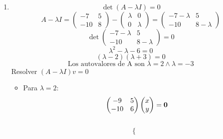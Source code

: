\documentclass[../practica.root.tex]{subfiles}
\begin{document}
\begin{enumerate}
\begin{enumerate*}
          \end{enumerate*}
          \begin{enumerate}
              \item \[ \det(A - \lambda I ) = 0 \]
                    \[ A - \lambda I = \begin{pmatrix}
                            -7  & 5 \\
                            -10 & 8
                        \end{pmatrix} - \begin{pmatrix}
                            \lambda & 0       \\
                            0       & \lambda
                        \end{pmatrix} = \begin{pmatrix}
                            -7 - \lambda & 5           \\
                            -10          & 8 - \lambda
                        \end{pmatrix} \]
                    \[ \det\begin{pmatrix}
                            -7 - \lambda & 5           \\
                            -10          & 8 - \lambda
                        \end{pmatrix} = 0 \]
                    \[ \lambda^2 - \lambda - 6 = 0 \]
                    \[ (\lambda - 2)(\lambda + 3) = 0 \]
                    \[ \boxed{\text{Los autovalores de A son } \lambda = 2 \land \lambda = -3} \]
                    Resolver $ ( A - \lambda I )v = 0 $
                    \begin{itemize}
                        \item Para $ \lambda = 2 $:
                              \[
                                  \begin{pmatrix}
                                      -9  & 5 \\
                                      -10 & 6
                                  \end{pmatrix}
                                  \begin{pmatrix}
                                      x \\ y
                                  \end{pmatrix}
                                  =
                                  \mathbf{0}
                              \] \[
                                  \begin{cases}

\end{cases}\]
\end{itemize}
\end{enumerate}
\end{enumerate}
\end{document}
